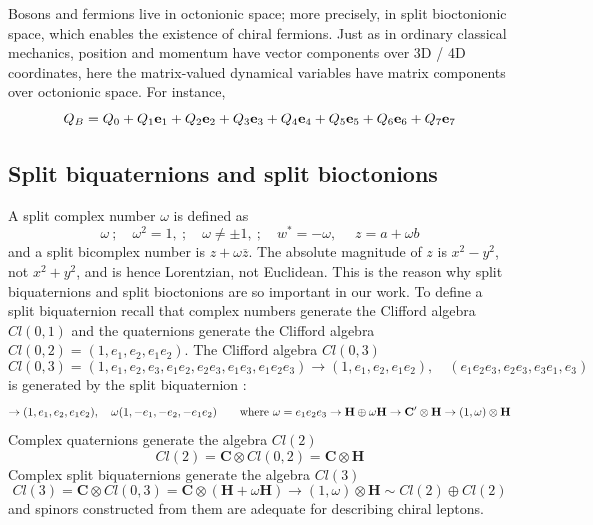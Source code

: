 \documentclass{iopconfser}
\begin{document}
Bosons and fermions live in octonionic space; more precisely, in split bioctonionic space, which enables the existence of chiral fermions. Just as in ordinary classical mechanics, position and momentum have vector components over 3D / 4D coordinates, here the matrix-valued dynamical variables have matrix components over octonionic space. For instance,
\begin{equation}
Q_B = Q_0 + Q_1 {\bf e}_1 + Q_2 {\bf e}_2 + Q_3 {\bf e}_3 + Q_4 {\bf e}_4 + Q_5 {\bf e}_5 + Q_6 {\bf e}_6 + Q_7 {\bf e}_7
\end{equation}


\subsection{Split biquaternions and split bioctonions}
A split complex number $\omega$ is defined as
\begin{equation}
\omega \ ; \quad \omega^2 = 1, \ ; \quad\omega\neq \pm 1, \ ; \quad w^* = -\omega, \; \quad z=a+\omega b
\end{equation}
and a split bicomplex number is $z + \omega \overline z$. The absolute magnitude of $z$ is $x^2 - y^2$, not $x^2 + y^2$, and is hence Lorentzian, not Euclidean. This is the reason why split biquaternions and split bioctonions are so important in our work. To define a split biquaternion recall that complex numbers generate the Clifford algebra $Cl(0,1)$ and the quaternions generate the Clifford algebra $Cl(0, 2)= (1, e_1, e_2, e_1e_2)$. The Clifford algebra $Cl(0,3)$
\begin{equation}
 Cl(0, 3)= (1, e_1, e_2, e_3, e_1e_2, e_2e_3, e_1e_3, e_1e_2e_3) \rightarrow (1, e_1, e_2, e_1e_2), \quad (e_1e_2e_3, e_2e_3, e_3e_1,e_3)
\end{equation} 
is generated by the split biquaternion \cite{Vaibhav}:
\begin{equation}
\rightarrow  (1, e_1, e_2, e_1e_2), \quad \omega (1, -e_1, -e_2, -e_1e_2)\qquad {\rm where}\ \omega=e_1e_2e_3 \rightarrow {\mathbf H} \oplus \omega {\mathbf H}\rightarrow {\mathbf C'}\otimes \mathbf H \rightarrow (1,\omega)\otimes \mathbf H
\end{equation}
Complex quaternions generate the algebra $Cl(2)$
\begin{equation}
Cl(2) = \mathbf C\otimes Cl(0,2) = \mathbf C \otimes \mathbf H
\end{equation}
Complex split biquaternions generate the algebra $Cl(3)$
\begin{equation}
Cl(3) = \mathbf C\otimes Cl(0,3) = \mathbf C \otimes (\mathbf H +\omega \mathbf H) \rightarrow (1,\omega)\otimes \mathbf H \sim Cl(2)\oplus Cl(2)
\end{equation}
and spinors constructed from them are adequate for describing chiral leptons.
\end{document}
